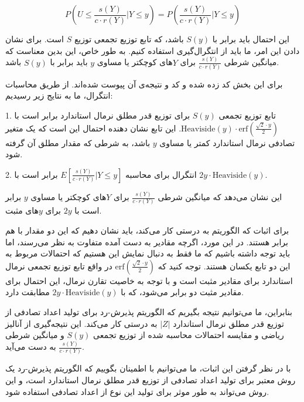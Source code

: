\[ P(U \leq \frac{s(Y)}{c \cdot r(Y)} | Y \leq y) = P(\frac{s(Y)}{c \cdot r(Y)} | Y \leq y) \]

این احتمال باید برابر با \( S(y) \) باشد، که تابع توزیع تجمعی توزیع \( S \) است. برای نشان دادن این امر، ما باید از انتگرال‌گیری استفاده کنیم. به طور خاص، این بدین معناست که میانگین شرطی \( \frac{s(Y)}{c \cdot r(Y)} \) برای \( Y \)‌های کوچکتر یا مساوی \( y \) باید برابر با \( S(y) \) باشد.

برای این بخش کد زده شده و کد و نتیجه‌ی آن پیوست شده‌اند. از طریق محاسبات انتگرال، ما به نتایج زیر رسیدیم:

1. تابع توزیع تجمعی \( S(y) \) برای توزیع قدر مطلق نرمال استاندارد برابر است با 
\( \text{Heaviside}(y) \cdot \text{erf}\left(\frac{\sqrt{2} \cdot y}{2}\right) \).
این تابع نشان دهنده احتمال این است که یک متغیر تصادفی نرمال استاندارد کمتر یا مساوی \( y \) باشد، به شرطی که مقدار مطلق آن گرفته شود.

2. انتگرال برای محاسبه \( E\left[\frac{s(Y)}{c \cdot r(Y)} | Y \leq y\right] \) برابر است با \( 2y \cdot \text{Heaviside}(y) \).

این نشان می‌دهد که میانگین شرطی \( \frac{s(Y)}{c \cdot r(Y)} \) برای \( Y \)‌های کوچکتر یا مساوی \( y \) برابر است با \( 2y \) برای \( y \)‌های مثبت.

برای اثبات که الگوریتم به درستی کار می‌کند، باید نشان دهیم که این دو مقدار با هم برابر هستند. در این مورد، اگرچه مقادیر به دست آمده متفاوت به نظر می‌رسند، اما باید توجه داشته باشیم که ما فقط به دنبال نمایش این هستیم که احتمالات مربوط به این دو تابع یکسان هستند. توجه کنید که \( \text{erf}\left(\frac{\sqrt{2} \cdot y}{2}\right) \) در واقع تابع توزیع تجمعی نرمال استاندارد برای مقادیر مثبت است و با توجه به خاصیت تقارن نرمال، این احتمال برای مقادیر مثبت دو برابر می‌شود، که با \( 2y \cdot \text{Heaviside}(y) \) مطابقت دارد.

بنابراین، ما می‌توانیم نتیجه بگیریم که الگوریتم پذیرش-رد برای تولید اعداد تصادفی از توزیع قدر مطلق نرمال استاندارد \( |Z| \) به درستی کار می‌کند. این نتیجه‌گیری از آنالیز ریاضی و مقایسه احتمالات محاسبه شده از توزیع تجمعی \( S(y) \) و میانگین شرطی \( \frac{s(Y)}{c \cdot r(Y)} \) به دست می‌آید.

با در نظر گرفتن این اثبات، ما می‌توانیم با اطمینان بگوییم که الگوریتم پذیرش-رد یک روش معتبر برای تولید اعداد تصادفی از توزیع قدر مطلق نرمال استاندارد است، و این روش می‌تواند به طور موثر برای تولید این نوع از اعداد تصادفی استفاده شود.
